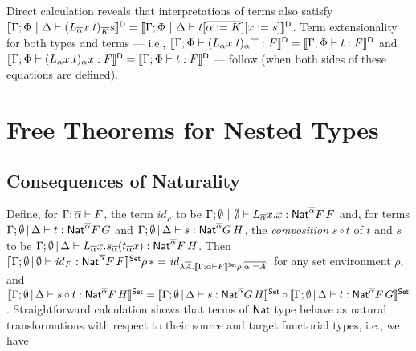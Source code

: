 \documentclass[runningheads]{llncs}
\renewcommand{\id}{\mathit{id}}
\renewcommand{\id}{\mathit{id}}
\begin{document}
Direct calculation reveals that interpretations of terms also
satisfy
$\llbracket{\Gamma; \Phi~|~\Delta \vdash
  (L_{\overline{\alpha}}x.t)_{\overline{K}}s}\rrbracket^{\mathsf D} = \llbracket{\Gamma; \Phi~|~\Delta
  \vdash t [\overline{\alpha := K}][x := s]}\rrbracket^{\mathsf D}$.
Term extensionality for both types and terms --- i.e.,
$\llbracket{\Gamma;\Phi\vdash (L_\alpha x.t)_\alpha \top : F}\rrbracket^{\mathsf D} =
\llbracket{\Gamma;\Phi \vdash t : F}\rrbracket^{\mathsf D}$ and
$\llbracket{\Gamma;\Phi\vdash (L_\alpha x.t)_\alpha x : F}\rrbracket^{\mathsf D} =
\llbracket{\Gamma;\Phi \vdash t : F}\rrbracket^{\mathsf D}$
--- follow (when both sides of these equations are defined).


\section{Free Theorems for Nested Types}\label{sec:ftnt}

\vspace*{-0.05in}

\subsection{Consequences of Naturality}\label{sec:Nat-type-terms}   

\vspace*{-0.05in}

Define, for $\Gamma; \overline{\alpha} \vdash F$, the term $\id_F$ to be
$\Gamma;\emptyset~|~\emptyset \vdash L_{\overline{\alpha}}x.x :
\mathsf{Nat}^{\overline{\alpha}} F\,F$ and, for terms $\Gamma; \emptyset \,|\,
\Delta \vdash t: \mathsf{Nat}^{\overline{\alpha}} F\,G$ and $\Gamma; \emptyset
\,|\, \Delta \vdash s: \mathsf{Nat}^{\overline{\alpha}} G\,H$, the {\em
  composition} $s \circ t$ of $t$ and $s$ to be $\Gamma;
\emptyset\,|\, \Delta \vdash L_{\overline{\alpha}}
x. s_{\overline{\alpha}}(t_{\overline{\alpha}}x):
\mathsf{Nat}^{\overline{\alpha}} F\,H$. Then $\setsem{\Gamma; \emptyset \,|\,
  \emptyset \vdash \id_{F} : \Nat^{\ol{\alpha}} F\,F} \rho\, \ast =
\id_{\lambda \ol{A}. \setsem{\Gamma; \ol{\alpha} \vdash F} \rho
  [\ol{\alpha := A}]}$ for any set environment $\rho$, and
$\llbracket{\Gamma; \emptyset \,|\, \Delta \vdash s \circ t:
  \mathsf{Nat}^{\overline{\alpha}} F\,H}\rrbracket^{\mathsf{Set}} = \llbracket{\Gamma; \emptyset \,|\,
  \Delta \vdash s: \mathsf{Nat}^{\overline{\alpha}} G\,H}\rrbracket^{\mathsf{Set}} \circ
\llbracket{\Gamma; \emptyset \,|\, \Delta \vdash t:
  \mathsf{Nat}^{\overline{\alpha}} F\,G}\rrbracket^{\mathsf{Set}}$. Straightforward calculation shows
that terms of $\mathsf{Nat}$ type behave as natural transformations with
respect to their source and target functorial types, i.e., we have
\end{document}
